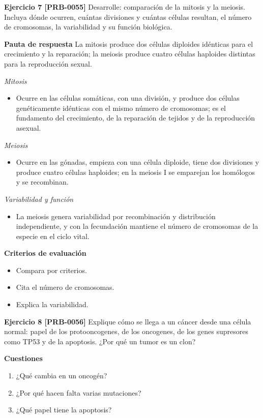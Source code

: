 \documentclass{book}
\begin{document}
\noindent\textbf{Ejercicio 7 [PRB-0055]}
Desarrolle: comparación de la mitosis y la meiosis. Incluya dónde ocurren, cuántas divisiones y cuántas células resultan, el número de cromosomas, la variabilidad y su función biológica.


\noindent\textbf{Pauta de respuesta}
La mitosis produce dos células diploides idénticas para el crecimiento y la reparación; la meiosis produce cuatro células haploides distintas para la reproducción sexual.


\noindent\textit{Mitosis}
\begin{itemize}
\item Ocurre en las células somáticas, con una división, y produce dos células genéticamente idénticas con el mismo número de cromosomas; es el fundamento del crecimiento, de la reparación de tejidos y de la reproducción asexual.
\end{itemize}

\noindent\textit{Meiosis}
\begin{itemize}
\item Ocurre en las gónadas, empieza con una célula diploide, tiene dos divisiones y produce cuatro células haploides; en la meiosis I se emparejan los homólogos y se recombinan.
\end{itemize}

\noindent\textit{Variabilidad y función}
\begin{itemize}
\item La meiosis genera variabilidad por recombinación y distribución independiente, y con la fecundación mantiene el número de cromosomas de la especie en el ciclo vital.
\end{itemize}

\noindent\textbf{Criterios de evaluación}
\begin{itemize}
\item Compara por criterios.
\item Cita el número de cromosomas.
\item Explica la variabilidad.
\end{itemize}

\noindent\textbf{Ejercicio 8 [PRB-0056]}
Explique cómo se llega a un cáncer desde una célula normal: papel de los protooncogenes, de los oncogenes, de los genes supresores como TP53 y de la apoptosis. ¿Por qué un tumor es un clon?


\noindent\textbf{Cuestiones}
\begin{enumerate}
\item ¿Qué cambia en un oncogén?
\item ¿Por qué hacen falta varias mutaciones?
\item ¿Qué papel tiene la apoptosis?
\end{enumerate}
\end{document}
